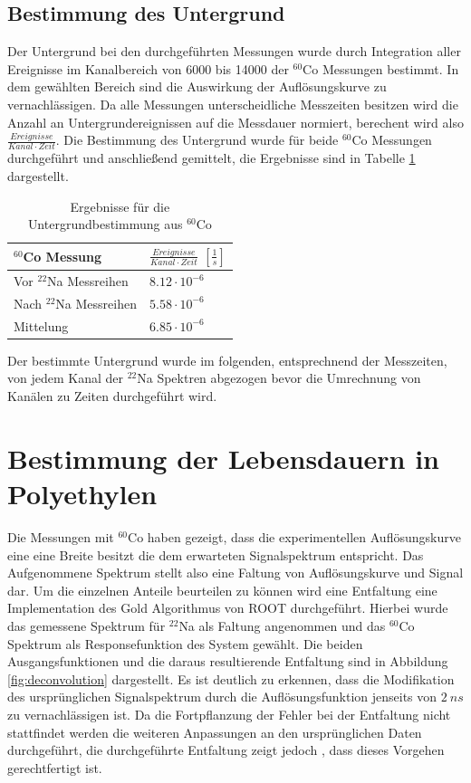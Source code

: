 \documentclass[a4paper,12pt]{article}
\begin{document}
\subsection{Bestimmung des Untergrund}
Der Untergrund bei den durchgeführten Messungen wurde durch Integration aller Ereignisse im Kanalbereich von 6000 bis 14000 der $^{60}$Co Messungen bestimmt. 
In dem gewählten Bereich sind die Auswirkung der Auflösungskurve zu vernachlässigen. Da alle Messungen unterscheidliche Messzeiten besitzen wird die Anzahl
an Untergrundereignissen auf die Messdauer normiert, berechent wird also $\frac{Ereignisse}{Kanal\cdot Zeit}$. Die Bestimmung des Untergrund wurde für beide
 $^{60}$Co Messungen durchgeführt und anschließend gemittelt, die Ergebnisse sind in Tabelle \ref{tab:background} dargestellt. 
 
 \begin{table}[h]
	\begin{tabular}{l |l }
		$^{60}$Co  Messung & $\frac{Ereignisse}{Kanal \cdot Zeit}$  $[\frac{1}{s}]$ \\
		\hline
		Vor $^{22}$Na Messreihen & $8.12 \cdot 10^{-6}$ \\
		Nach $^{22}$Na Messreihen &$ 5.58 \cdot 10^{-6}$\\
		\hline
		\hline
		Mittelung & $6.85 \cdot 10^{-6}$
	\end{tabular}
	\centering
	\caption{Ergebnisse für die Untergrundbestimmung aus $^{60}$Co}
	\label{tab:background}
\end{table}
 Der bestimmte Untergrund wurde im folgenden, entsprechnend der Messzeiten, von jedem Kanal der $^{22}$Na Spektren abgezogen bevor die Umrechnung von Kanälen zu Zeiten durchgeführt wird.   
\section{Bestimmung der Lebensdauern in Polyethylen}\label{cap:poly}
Die Messungen mit $^{60}$Co haben gezeigt, dass die experimentellen Auflösungskurve eine eine Breite besitzt die dem erwarteten Signalspektrum entspricht. Das Aufgenommene Spektrum
stellt also eine Faltung von Auflösungskurve und Signal dar. Um die einzelnen Anteile beurteilen zu
können wird eine Entfaltung eine Implementation des Gold Algorithmus\cite{gold_algo} von ROOT\cite{root} durchgeführt.
Hierbei wurde das gemessene Spektrum für $^{22}$Na als Faltung angenommen und das $^{60}$Co Spektrum als Responsefunktion des System
gewählt. Die beiden Ausgangsfunktionen und die daraus resultierende Entfaltung sind in Abbildung \ref{fig:deconvolution} dargestellt. Es ist deutlich zu erkennen, dass die
Modifikation des ursprünglichen Signalspektrum durch die Auflösungsfunktion jenseits von $\SI{2}{ns}$ zu vernachlässigen ist. Da die Fortpflanzung der Fehler bei
der Entfaltung nicht stattfindet werden die weiteren Anpassungen an den ursprünglichen Daten durchgeführt, die durchgeführte Entfaltung zeigt jedoch
, dass dieses Vorgehen gerechtfertigt ist.
\end{document}
